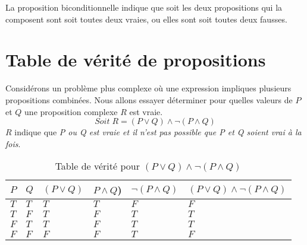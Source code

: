 \documentclass[16pt]{report}
\begin{document}
\begin{multicols*}{2}
            La proposition biconditionnelle indique que soit les deux propositions qui la composent sont soit toutes 
            deux vraies, ou elles sont soit toutes deux fausses.


            \section{Table de vérité de propositions}
            Considérons un problème plus complexe où une expression impliques plusieurs propositions combinées. 
            Nous allons essayer déterminer pour quelles valeurs de $P$ et $Q$ une proposition complexe $R$ est vraie. 
            \[ Soit \; R = (P \lor Q)\land \neg (P \land Q)\]
            $R$ indique que \textit{P ou Q est vraie et il n'est pas possible que P et Q soient vrai à la fois}.


            \begin{table}[H]
                \caption{Table de vérité pour $(P \lor Q) \land \neg (P \land Q)$}
                \begin{center}
                \renewcommand{\arraystretch}{1.5}
                \selectfont
                \footnotesize
            \begin{tabular}{|l|l||l|l|l||l|}
                    \arrayrulecolor{blue}\hline
                    \rowcolor{lightBlue}
                    \textcolor{myb}{$P$} & \textcolor{myb}{$Q$} & \textcolor{myb}{$(P \lor Q)$} & 
                    \textcolor{myb}{$P \land Q$)} & \textcolor{myb}{$\neg (P \land Q)$} & 
                    \textcolor{myb}{$(P \lor Q) \land \neg (P \land Q)$}
                    \\
                    \hline
                    \hline
                    \arrayrulecolor{black}
                    \cellcolor{myg} $T$ & \cellcolor{myg} $T$ & \cellcolor{myg} $T$ &
                    \cellcolor{myg} $T$ & \cellcolor{myr} $F$ & \cellcolor{myr} $F$ 
                    \\
                    \hline
                    \cellcolor{myg} $T$ & \cellcolor{myr} $F$ & \cellcolor{myg} $T$ & 
                    \cellcolor{myr} $F$ & \cellcolor{myg} $T$ & \cellcolor{myg} $T$ 
                    \\ 
                    \hline 
                    \cellcolor{myr} $F$ & \cellcolor{myg} $T$ & \cellcolor{myg} $T$ &
                    \cellcolor{myr} $F$ & \cellcolor{myg} $T$ & \cellcolor{myg} $T$ 
                    \\ 
                    \hline
                    \cellcolor{myr} $F$ & \cellcolor{myg} $F$ & \cellcolor{myr} $F$ &
                    \cellcolor{myr} $F$ & \cellcolor{myg} $T$ & \cellcolor{myr} $F$
                    \\ 
                    \hline
                    \end{tabular}
            \end{center}
            \end{table}
        

\end{multicols*}
\end{document}
